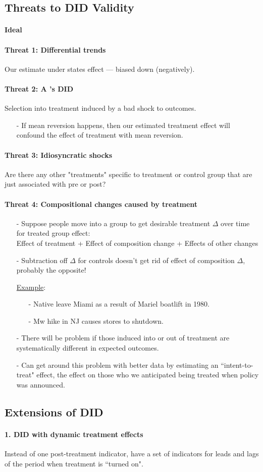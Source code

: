 \documentclass[a4paper,11pt]{article}
\newcommand{\myparagraph}[1]{\paragraph{#1}\mbox{}\par}
\begin{document}
\subsection{Threats to DID Validity}

\paragraph{Ideal}
\myparagraph{Threat 1: Differential trends} 
Our estimate under states effect --- biased down (negatively).
\myparagraph{Threat 2: A 's DID}
Selection into treatment induced by a bad shock to outcomes.
\begin{itemize}
	\item[-] If mean reversion happens, then our estimated treatment effect will confound the effect of treatment with mean reversion.
\end{itemize}
\myparagraph{Threat 3: Idiosyncratic shocks}
Are there any other "treatments" specific to treatment or control group that are just associated with pre or post?
\myparagraph{Threat 4: Compositional changes caused by treatment}
\begin{itemize}
	\item[-] Suppose people move into a group to get desirable treatment $\Delta$	over time for treated group effect:\\
	Effect of treatment + Effect of composition change + Effects of other changes
	\item[-] Subtraction off $\Delta$ for controls doesn't get rid of effect of composition $\Delta$, probably the opposite!
	
	\underline{Example}:
	\begin{itemize}
		\item[-] Native leave Miami as a result of Mariel boatlift in 1980.
		\item[-] Mw hike in NJ causes stores to shutdown.
	\end{itemize}
	\item[-] There will be problem if those induced into or out of treatment are systematically different in expected outcomes.
	\item[-] Can get around this problem with better data by estimating an ``intent-to-treat" effect, the effect on those who we anticipated being treated when policy was announced.
\end{itemize}

\subsection{Extensions of DID}
\myparagraph{1. DID with dynamic treatment effects}
Instead of one post-treatment indicator, have a set of indicators for leads and lags of the period when treatment is ``turned on".
\end{document}
